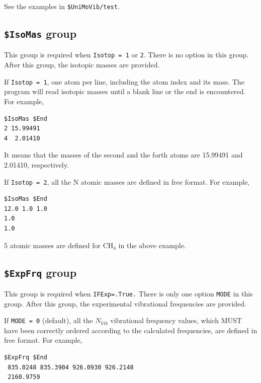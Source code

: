 \documentclass[12pt,english]{extarticle}
\begin{document}
See the examples in \verb|$UniMoVib/test|.


\subsection{\texttt{\$IsoMas} group} \label{sec:inp-isomas}

This group is required when \verb|Isotop = 1| or \verb|2|. There is no option in
this group. After this group, the isotopic masses are provided.

\bigskip{}
If \verb|Isotop = 1|, one atom per line, including the atom index and its
mass. The program will read isotopic masses until a blank line or
the end is encountered. For example,
\begin{Verbatim}[frame=single]
 $IsoMas $End
2 15.99491
4  2.01410
\end{Verbatim}
It means that the masses of the second and the forth atoms are 15.99491 and
2.01410, respectively.

\bigskip{}
If \verb|Isotop = 2|, all the N atomic masses are defined in free format.
For example,
\begin{Verbatim}[frame=single]
 $IsoMas $End
12.0 1.0 1.0
1.0
1.0
\end{Verbatim}
5 atomic masses are defined for CH$_4$ in the above example.


\subsection{\texttt{\$ExpFrq} group} \label{sec:inp-expfrq}

This group is required when \verb|IFExp=.True.| There is only one option
\verb|MODE| in this group. After this group, the experimental vibrational
frequencies are provided.

\bigskip{}
If \verb|MODE = 0| (default), all the $N_{Vib}$ vibrational frequency values, which MUST have been correctly
ordered according to the calculated frequencies, are defined in free format. For example,
\begin{Verbatim}[frame=single]
 $ExpFrq $End
 835.0248 835.3904 926.0930 926.2148
 2160.9759
\end{Verbatim}
\end{document}
